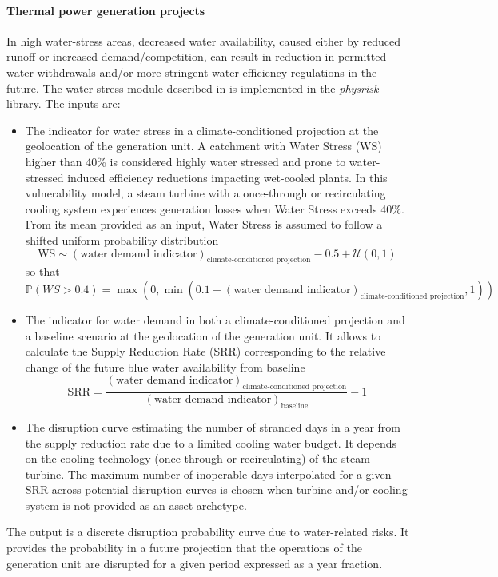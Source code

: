 \documentclass[a4paper,11pt]{extarticle} %
\theoremstyle{definition}
\begin{document}
\paragraph{Thermal power generation projects}
In high water-stress areas, decreased water availability, caused either by reduced runoff or increased demand/competition, can result in reduction in permitted water withdrawals and/or more stringent water efficiency regulations in the future. The water stress module described in \cite{LuoEtAl:2021,LuoEtAl:2023} is implemented in the \emph{physrisk} library. The inputs are:
\begin{itemize}
\item The indicator for water stress in a climate-conditioned projection at the geolocation of the generation unit. A catchment with Water Stress (WS) higher than 40\% is considered highly water stressed and prone to water-stressed induced efficiency reductions impacting wet-cooled plants. In this vulnerability model, a steam turbine with a once-through or recirculating cooling system experiences generation losses when Water Stress exceeds 40\%. From its mean provided as an input, Water Stress is assumed to follow a shifted uniform probability distribution
$$
\text{WS}\sim\left(\text{water demand indicator}\right)_{\text{climate-conditioned projection}}-0.5+\mathcal{U}\left(0,1\right)
$$
so that
$$
\mathbb{P}\left(WS>0.4\right)=\max\left(0,\min\left(0.1+\left(\text{water demand indicator}\right)_{\text{climate-conditioned projection}},1\right)\right)
$$
\item The indicator for water demand in both a climate-conditioned projection and a baseline scenario at the geolocation of the generation unit. It allows to calculate the Supply Reduction Rate (SRR) corresponding to the relative change of the future blue water availability from baseline
$$
\text{SRR}=\displaystyle\frac{\left(\text{water demand indicator}\right)_{\text{climate-conditioned projection}}}{\left(\text{water demand indicator}\right)_{\text{baseline}}}-1
$$
\item The disruption curve estimating the number of stranded days in a year from the supply reduction rate due to a limited cooling water budget. It depends on the cooling technology (once-through or recirculating) of the steam turbine. The maximum number of inoperable days interpolated for a given SRR across potential disruption curves is chosen when turbine and/or cooling system is not provided as an asset archetype.
\end{itemize}
The output is a discrete disruption probability curve due to water-related risks. It provides the probability in a future projection that the operations of the generation unit are disrupted for a given period expressed as a year fraction.
\end{document}
